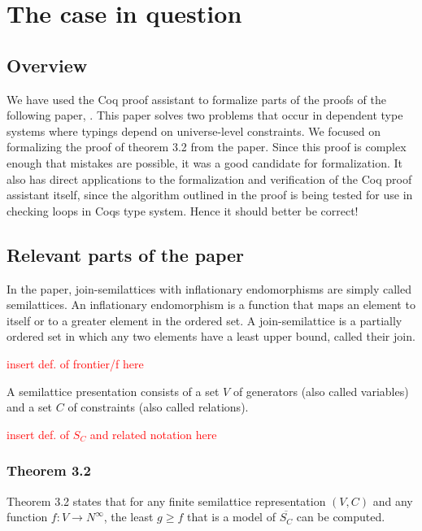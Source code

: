\chapter{The case in question}

\section{Overview}

We have used the Coq proof assistant to formalize parts of the proofs of the following paper, \citeauthor{mbezem} \cite{mbezem}.
This paper solves two problems that occur in dependent type systems where typings depend
on universe-level constraints. We focused on formalizing the proof of theorem 3.2 from the paper.
Since this proof is complex enough that mistakes are possible, it was a good candidate for formalization.
It also has direct applications to the formalization and verification of the Coq proof assistant itself,
since the algorithm outlined in the proof is being tested \cite{coqgithub}
for use in checking loops in Coqs type system. Hence it should better be correct!

\section{Relevant parts of the paper}

In the paper, join-semilattices with inflationary endomorphisms
are simply called semilattices. An inflationary endomorphism is a function
that maps an element to itself or to a greater element in the ordered set.
A join-semilattice is a partially ordered set in which any two elements have a least upper bound,
called their join.

\textcolor{red}{insert def. of frontier/f here}

A semilattice presentation consists of a set $V$ of generators
(also called variables) and a set  $C$ of constraints
(also called relations).

\textcolor{red}{insert def. of $S_C$ and related notation here}


\subsection{Theorem 3.2}

Theorem 3.2 states that for any finite semilattice representation
$(V, C)$ and any function $f : V \rightarrow N^{\infty}$,
the least $g \ge f$ that is a model of $\overline{S_C}$ can be computed.

